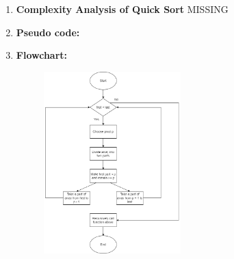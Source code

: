 \documentclass[11pt,a4paper]{article}
\begin{document}
{\begin{enumerate}[label=\textbf{\arabic*})]
					Quick Sort picks an element as pivot and partitions the given array around the picked pivot. Then, it sorts the parts independently. Finally, it combines the sorted subsequences by a simple concatenation.
				\\[12pt]
				\item \textbf{Complexity Analysis of Quick Sort}
					MISSING
				\\[12pt]
				\item \textbf{Pseudo code:} 
				\pagebreak
				\item \textbf{Flowchart:}
					\begin{figure}[H]
						\centering 
						\includegraphics[width=0.5\textwidth]{QuickSortFlowChart}
					\end{figure}
					

\end{enumerate}}
\end{document}
